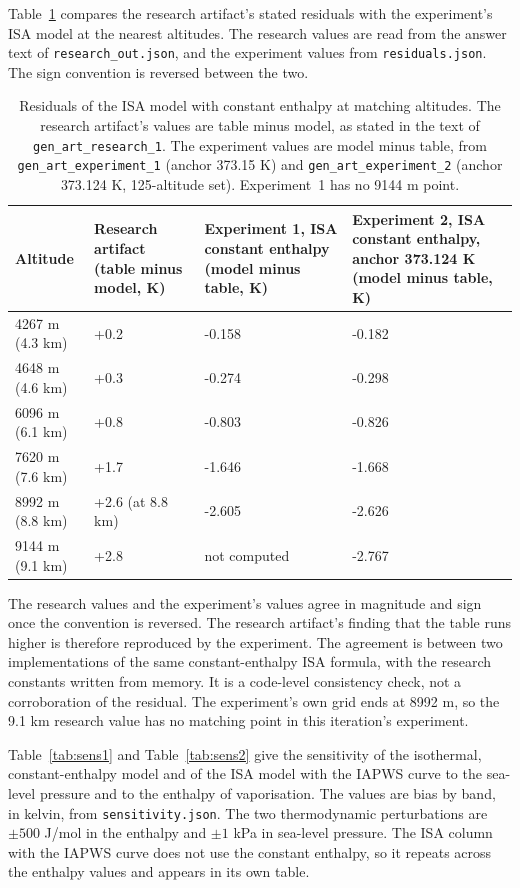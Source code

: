 \documentclass[11pt,letterpaper]{article}
\begin{document}
Table~\ref{tab:res_vs_exp} compares the research artifact's stated residuals with the experiment's ISA model at the nearest altitudes. The research values are read from the answer text of \texttt{research\_out.json}, and the experiment values from \texttt{residuals.json}. The sign convention is reversed between the two.

\begin{table}[!htbp]
\centering\small
\caption{Residuals of the ISA model with constant enthalpy at matching altitudes. The research artifact's values are table minus model, as stated in the text of \texttt{gen\_art\_research\_1}. The experiment values are model minus table, from \texttt{gen\_art\_experiment\_1} (anchor 373.15 K) and \texttt{gen\_art\_experiment\_2} (anchor 373.124 K, 125-altitude set). Experiment~1 has no 9144 m point.}\label{tab:res_vs_exp}
\begin{tabular}{p{2.6cm}p{3.2cm}p{3.6cm}p{3.6cm}}
\toprule
Altitude & Research artifact (table minus model, K) & Experiment 1, ISA constant enthalpy (model minus table, K) & Experiment 2, ISA constant enthalpy, anchor 373.124 K (model minus table, K) \\
\midrule
4267 m (4.3 km) & +0.2 & -0.158 & -0.182 \\
4648 m (4.6 km) & +0.3 & -0.274 & -0.298 \\
6096 m (6.1 km) & +0.8 & -0.803 & -0.826 \\
7620 m (7.6 km) & +1.7 & -1.646 & -1.668 \\
8992 m (8.8 km) & +2.6 (at 8.8 km) & -2.605 & -2.626 \\
9144 m (9.1 km) & +2.8 & not computed & -2.767 \\
\bottomrule
\end{tabular}
\end{table}

The research values and the experiment's values agree in magnitude and sign once the convention is reversed. The research artifact's finding that the table runs higher is therefore reproduced by the experiment. The agreement is between two implementations of the same constant-enthalpy ISA formula, with the research constants written from memory. It is a code-level consistency check, not a corroboration of the residual. The experiment's own grid ends at 8992 m, so the 9.1 km research value has no matching point in this iteration's experiment.

Table~\ref{tab:sens1} and Table~\ref{tab:sens2} give the sensitivity of the isothermal, constant-enthalpy model and of the ISA model with the IAPWS curve to the sea-level pressure and to the enthalpy of vaporisation. The values are bias by band, in kelvin, from \texttt{sensitivity.json}. The two thermodynamic perturbations are $\pm 500$ J/mol in the enthalpy and $\pm 1$ kPa in sea-level pressure. The ISA column with the IAPWS curve does not use the constant enthalpy, so it repeats across the enthalpy values and appears in its own table.
\end{document}
